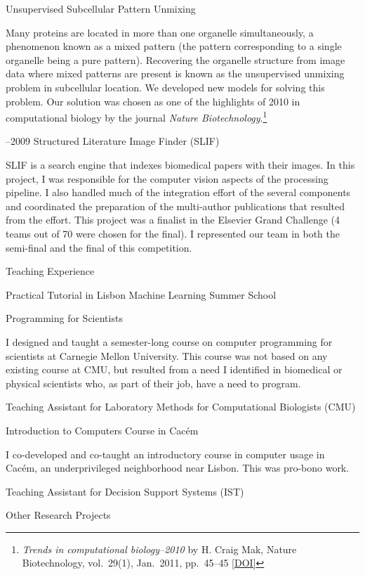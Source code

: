 \documentclass{article}
\renewcommand\section[1]{%
    \par\vspace{2em}\penalty-100%
    {\subhead #1}%
    \par\penalty100\vspace{1em}\penalty100%
}
\newcommand\cvitem[2][\relax]{%
    \par\vspace{.8em}
    \if\relax#1\else{\Date \textcolor{medg}{#1}}\hspace{1em}\fi%
    {\CvItem #2}%
    \par\vspace{.4em}
}
\newcommand\showdoi[1]{%
    \href{http://dx.doi.org/#1}{[DOI]}%
}
\begin{document}
\cvitem[2010]{Unsupervised Subcellular Pattern Unmixing}
Many proteins are located in more than one organelle simultaneously, a
phenomenon known as a mixed pattern (the pattern corresponding to a single
organelle being a pure pattern). Recovering the organelle structure from image
data where mixed patterns are present is known as the unsupervised unmixing
problem in subcellular location. We developed new models for
solving this problem. Our solution was chosen as one of the highlights of 2010
in computational biology by the journal \emph{Nature Biotechnology}.\footnote{%
\emph{Trends in computational biology--2010} by H. Craig Mak, Nature
Biotechnology, vol.\ 29(1), Jan.\ 2011, pp.\ 45--45 \showdoi{10.1038/nbt.1747}}

\cvitem[2008--2009]{Structured Literature Image Finder (SLIF)}
SLIF is a search engine that indexes biomedical papers with their images. In
this project, I was responsible for the computer vision aspects of the
processing pipeline. I also handled much of the integration effort of the
several components and coordinated the preparation of the multi-author
publications that resulted from the effort. This project was a finalist in the
Elsevier Grand Challenge (4 teams out of 70 were chosen for the final). I
represented our team in both the semi-final and the final of this competition.

\break
\section{Teaching Experience}

\cvitem[2011]{Practical Tutorial in Lisbon Machine Learning Summer School}

\cvitem[2009]{Programming for Scientists}
I designed and taught a semester-long course on computer programming for
scientists at Carnegie Mellon University. This course was not based on any
existing course at CMU, but resulted from a need I identified in biomedical or
physical scientists who, as part of their job, have a need to program.

\cvitem[2008]{Teaching Assistant for Laboratory Methods for Computational Biologists (CMU)}
\cvitem[2005]{Introduction to Computers Course in Cacém}
I co-developed and co-taught an introductory course in computer usage in
Cacém, an underprivileged neighborhood near Lisbon. This was pro-bono work.

\cvitem[2005]{Teaching Assistant for Decision Support Systems (IST)}

\section{Other Research Projects}
\end{document}
